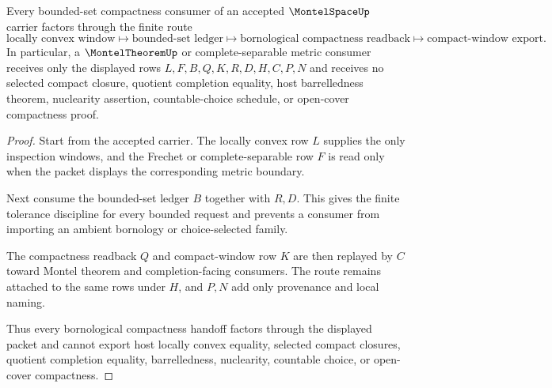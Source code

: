 \begin{theorem}
\label{thm:montel-space-bornological-compactness-route}
Every bounded-set compactness consumer of an accepted $\MontelSpaceUp$ carrier factors through the finite route
$$
\text{locally convex window}
\longmapsto
\text{bounded-set ledger}
\longmapsto
\text{bornological compactness readback}
\longmapsto
\text{compact-window export}.
$$
In particular, a $\MontelTheoremUp$ or complete-separable metric consumer receives only the displayed rows $L,F,B,Q,K,R,D,H,C,P,N$ and receives no selected compact closure, quotient completion equality, host barrelledness theorem, nuclearity assertion, countable-choice schedule, or open-cover compactness proof.
\end{theorem}
\begin{proof}
Start from the accepted carrier. The locally convex row $L$ supplies the only inspection windows, and the Frechet or complete-separable row $F$ is read only when the packet displays the corresponding metric boundary.

Next consume the bounded-set ledger $B$ together with $R,D$. This gives the finite tolerance discipline for every bounded request and prevents a consumer from importing an ambient bornology or choice-selected family.

The compactness readback $Q$ and compact-window row $K$ are then replayed by $C$ toward Montel theorem and completion-facing consumers. The route remains attached to the same rows under $H$, and $P,N$ add only provenance and local naming.

Thus every bornological compactness handoff factors through the displayed packet and cannot export host locally convex equality, selected compact closures, quotient completion equality, barrelledness, nuclearity, countable choice, or open-cover compactness.
\end{proof}

